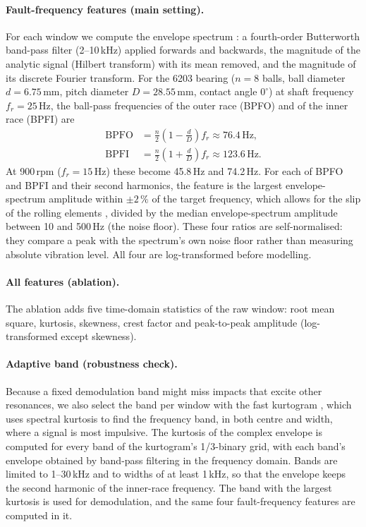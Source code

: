 \paragraph{Fault-frequency features (main setting).} For each window we compute the envelope spectrum
\citep{randall2011}: a fourth-order Butterworth band-pass filter (2--10\,kHz) applied forwards and backwards, the
magnitude of the analytic signal (Hilbert transform) with its mean removed, and the magnitude of its discrete
Fourier transform. For the 6203 bearing ($n = 8$ balls, ball diameter $d = 6.75$\,mm, pitch diameter
$D = 28.55$\,mm, contact angle $0^\circ$) at shaft frequency $f_r = 25$\,Hz, the ball-pass frequencies of the outer
race (BPFO) and of the inner race (BPFI) are
\begin{equation}
  \begin{aligned}
    \mathrm{BPFO} &= \frac{n}{2}\left(1 - \frac{d}{D}\right) f_r \approx 76.4\,\mathrm{Hz},\\
    \mathrm{BPFI} &= \frac{n}{2}\left(1 + \frac{d}{D}\right) f_r \approx 123.6\,\mathrm{Hz}.
  \end{aligned}
\end{equation}
At 900\,rpm ($f_r = 15$\,Hz) these become 45.8\,Hz and 74.2\,Hz.
For each of BPFO and BPFI and their second harmonics, the feature is the largest envelope-spectrum amplitude within
$\pm 2\,\%$ of the target frequency, which allows for the slip of the rolling elements \citep{randall2011}, divided
by the median envelope-spectrum amplitude between 10 and 500\,Hz (the noise floor). These
four ratios are self-normalised: they compare a peak with the spectrum's own noise floor rather than measuring
absolute vibration level. All four are log-transformed before modelling.

\paragraph{All features (ablation).} The ablation adds five time-domain statistics of the raw window: root mean
square, kurtosis, skewness, crest factor and peak-to-peak amplitude (log-transformed except skewness).

\paragraph{Adaptive band (robustness check).} Because a fixed demodulation band might miss impacts that excite
other resonances, we also select the band per window with the fast kurtogram \citep{antoni2007}, which uses spectral
kurtosis \citep{antoni2006} to find the frequency band, in both centre and width, where a signal is most impulsive.
The kurtosis of the complex envelope is computed for every band of the kurtogram's 1/3-binary grid, with each band's
envelope obtained by band-pass filtering in the frequency domain. Bands are limited to 1--30\,kHz and to widths of
at least 1\,kHz, so that the envelope keeps the second harmonic of the inner-race frequency. The band with the
largest kurtosis is used for demodulation, and the same four fault-frequency features are computed in it.

